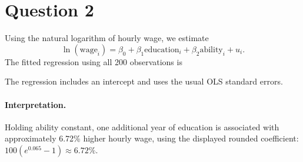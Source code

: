 \section*{Question 2}
Using the natural logarithm of hourly wage, we estimate
\[
\ln(\mathrm{wage}_i) = \beta_0 + \beta_1\mathrm{education}_i
  + \beta_2\mathrm{ability}_i + u_i.
\]
The fitted regression using all 200 observations is


\noindent The regression includes an intercept and uses the usual OLS standard errors.

\paragraph{Interpretation.}
Holding ability constant, one additional year of education is associated
with approximately 6.72\% higher hourly wage, using the displayed rounded
coefficient: $100(e^{0.065}-1)\approx 6.72\%$.
